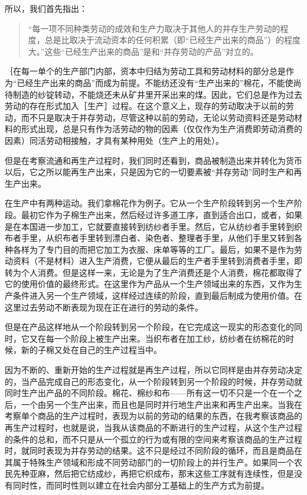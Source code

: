 所以，我们首先指出：

\begin{quote}{“每一项不同种类劳动的成效和生产力取决于其他人的并存生产劳动的程度，总是比取决于流动资本的任何积累（即“已经生产出来的商品”）的程度大。”这些“已经生产出来的商品”是和“并存劳动的产品”对立的。}\end{quote}

｛在每一单个的生产部门内部，资本中归结为劳动工具和劳动材料的部分总是作为“已经生产出来的商品”而成为前提。不能纺还没有“生产出来的”棉花，不能使尚待制造的纱锭转动，不能烧还未从矿井里开采出来的煤。因此，它们总是作为过去劳动的存在形式加入［生产］过程。在这个意义上，现存的劳动取决于以前的劳动，而不只是取决于并存劳动，尽管这种以前的劳动，无论以劳动资料还是劳动材料的形式出现，总是只有作为活劳动的物的因素（仅仅作为生产消费即劳动消费的因素）同活劳动相接触，才具有某种用处（生产上的用处）。

但是在考察流通和再生产过程时，我们同时还看到，商品被制造出来并转化为货币以后，它之所以能再生产出来，只是因为它的一切要素被“并存劳动”同时生产和再生产出来。

在生产中有两种运动。我们拿棉花作为例子。它从一个生产阶段转到另一个生产阶段。最初它作为子棉生产出来，然后经过许多道工序，直到适合出口，或者，如果是在本国进一步加工，它就要直接转到纺纱者手里。然后，它从纺纱者手里转到织布者手里，从织布者手里转到漂白者、染色者、整理者手里，从他们手里又转到各种各样为了专门目的而把它加工为衣服、床单等等的工厂。最后，如果不是作为劳动资料（不是材料）进入生产消费，它便从最后的生产者手里转到消费者手里，即转为个人消费。但是这样一来，无论是为了生产消费还是个人消费，棉花都取得了它的使用价值的最终形式。在这里作为产品从一个生产领域出来的东西，又作为生产条件进入另一个生产领域，这样经过连续的阶段，直到最后制成为使用价值。在这里过去劳动不断表现为现在正在进行的劳动的条件。

但是在产品这样地从一个阶段转到另一个阶段，在它完成这一现实的形态变化的同时，它又在每一个阶段上被生产出来。当织布者在加工纱，纺纱者在纺棉花的时候，新的子棉又处在自己的生产过程当中。

因为不断的、重新开始的生产过程就是再生产过程，所以它同样是由并存劳动决定的，当产品完成自己的形态变化，从一个阶段转到另一个阶段的时候，并存劳动就同时生产出产品的不同阶段。棉花、棉纱和布——所有这一切不只是一个在一个之后，一个由另一个生产出来，而且也是同时并行地生产出来和再生产出来。当我在考察单个商品的生产过程时，表现为以前的劳动的结果的东西，在我考察该商品的再生产过程时，也就是说，当我从该商品的不断进行的生产过程，从这个生产过程的条件的总和，而不只是从一个孤立的行为或有限的空间来考察该商品的生产过程时，就同时表现为并存劳动的结果。这不只是经过不同阶段的循环，而且是商品在其属于特殊生产领域和形成不同劳动部门的一切阶段上的并行生产。如果同一个农民先种亚麻，然后把它纺成纱，再把它织成布，那末这些工序就有连续性，但是没有同时性，而同时性则以建立在社会内部分工基础上的生产方式为前提。

